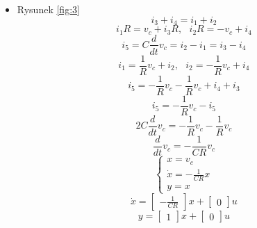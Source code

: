 \documentclass[12pt, letterpaper]{article}
\begin{document}
\begin{enumerate}
\begin{itemize}
            \item Rysunek \ref{fig:3}
                \[i_3+i_4=i_1+i_2\]
                \[i_1R=v_c+i_3R,\text{ }i_2R=-v_c+i_4\]
                \[i_5=C\frac{d}{dt}v_c=i_2-i_1=i_3-i_4\]
                \[i_1=\frac{1}{R}v_c+i_2,\text{ }i_2=-\frac{1}{R}v_c+i_4\]
                \[i_5=-\frac{1}{R}v_c-\frac{1}{R}v_c+i_4+i_3\]
                \[i_5=-\frac{1}{R}v_c-i_5\]
                \[2C\frac{d}{dt}v_c=-\frac{1}{R}v_c-\frac{1}{R}v_c\]
                \[\frac{d}{dt}v_c=-\frac{1}{CR}v_c\]
                \[\begin{cases}
                    x=v_c\\
                    \dot{x}=-\frac{1}{CR}x\\
                    y=x
                \end{cases}\]
                \[\dot{x}=
                \begin{bmatrix}
                    -\frac{1}{CR}
                \end{bmatrix}x+
                \begin{bmatrix}
                    0
                \end{bmatrix}u\]
                \[y=
                \begin{bmatrix}
                    1
                \end{bmatrix}x+
                \begin{bmatrix}
                    0
                \end{bmatrix}u\]


\end{itemize}
\end{enumerate}
\end{document}
